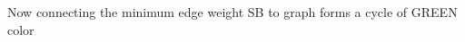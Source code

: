 \documentclass[preview]{standalone}
\begin{document}
\begin{center}
Now connecting the minimum edge weight SB to graph forms a cycle of GREEN color
\end{center}
\end{document}
